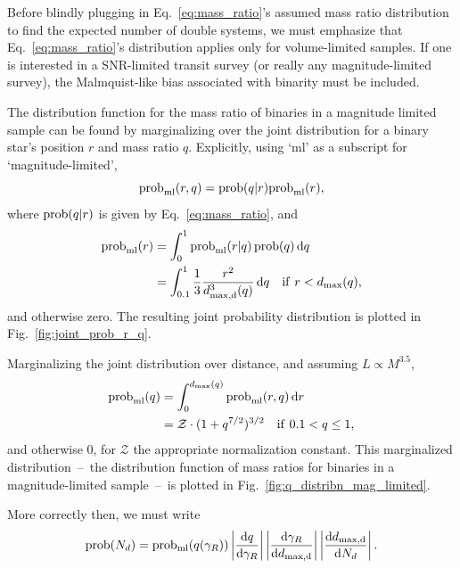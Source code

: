 \documentclass{emulateapj}
\begin{document}
Before blindly plugging in Eq.~\ref{eq:mass_ratio}'s assumed mass ratio 
distribution to find the expected number of double systems, we must
emphasize that Eq.~\ref{eq:mass_ratio}'s distribution applies only for 
volume-limited samples.
If one is interested in a SNR-limited transit survey (or really any
magnitude-limited survey), the Malmquist-like bias associated with binarity
must be included.

The distribution function for the mass ratio of binaries in a magnitude 
limited sample can be found by marginalizing over the joint 
distribution for a binary star's position $r$ and mass ratio $q$.
Explicitly, using `ml' as a subscript for `magnitude-limited',
\begin{equation}
{\rm prob}_{\rm ml}(r,q) = {\rm prob}(q|r){\rm prob}_{\rm ml}(r),
\end{equation} 
where ${\rm prob}(q|r)$ is given by Eq.~\ref{eq:mass_ratio}, and 
\begin{align}
{\rm prob}_{\rm ml}(r) &= \int_{0}^{1} {\rm prob}_{\rm ml}(r|q)\,{\rm 
	prob}(q)\,{\rm d}q
\\
&= \int_{0.1}^{1} \frac{1}{3} \frac{r^2}{d_{\rm max,d}^3(q)}\,{\rm d}q
\quad {\rm if\ }r<d_{\rm max}(q),
\end{align}
and otherwise zero. The resulting joint probability distribution is plotted in 
Fig.~\ref{fig:joint_prob_r_q}.

Marginalizing the joint distribution over distance, and assuming $L\propto 
M^{3.5}$,
\begin{align}
{\rm prob}_{\rm ml}(q) &= 
\int_{0}^{d_{\rm max}(q)} {\rm prob}_{\rm ml}(r,q) \,{\rm d}r \\
&= \mathcal{Z}\cdot (1+q^{7/2})^{3/2}\quad {\rm if\ }0.1<q\leq 1,
\label{eq:pdf_q_mag_limited}
\end{align}
and otherwise 0, for $\mathcal{Z}$ the appropriate normalization constant.
This marginalized distribution~--~the distribution function of mass ratios for 
binaries in a magnitude-limited sample~--~is plotted in 
Fig.~\ref{fig:q_distribn_mag_limited}.

More correctly then, we must write
\begin{equation}
{\rm prob}(N_d) = {\rm prob_{ml}}(q(\gamma_R)) 
\left| \frac{{\rm d}q}{{\rm d}\gamma_R}  \right|
\left| \frac{{\rm d}\gamma_R}{{\rm d}d_{\rm max,d}}  \right|				
\left| \frac{{\rm d}d_{\rm max,d}}{{\rm d}N_d}  \right|.
\end{equation}
\end{document}
